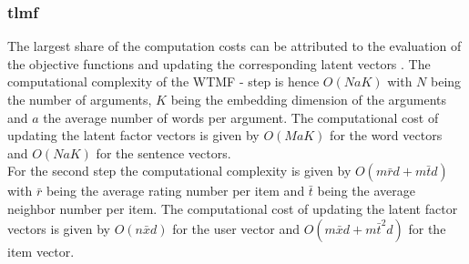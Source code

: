 \subsubsection{\acrshort{tlmf}}
The largest share of the computation costs can be attributed to the evaluation of the objective functions and updating the corresponding latent vectors \cite{li2016two}. 
The computational complexity of the WTMF - step is hence $O(N a K)$ with $N$ being the number of arguments, $K$ being the embedding dimension of the arguments and $a$ the average number of words per argument. The computational cost of updating the latent factor vectors is given by $O(M a K)$ for the word vectors and $O(N a K)$ for the sentence vectors.\\
For the second step the computational complexity is given by $O(m\bar{r}d + m\bar{t}d)$ with $\bar{r}$ being the average rating number per item and $\bar{t}$ being the average neighbor number per item. The computational cost of updating the latent factor vectors is given by $O(n\bar{x}d)$ for the user vector and $O(m\bar{x}d + m\bar{t}^{2}d)$ for the item vector.


